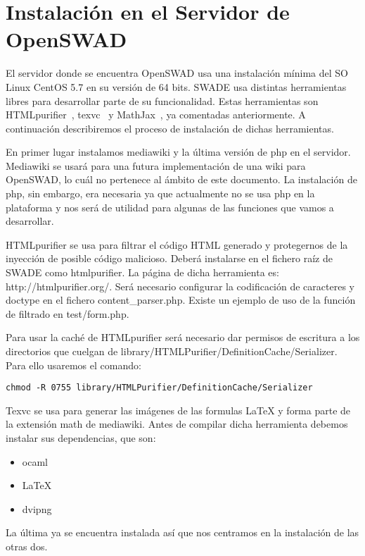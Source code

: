 \chapter{Instalación en el Servidor de OpenSWAD}

El servidor donde se encuentra OpenSWAD usa una instalación mínima del SO Linux CentOS 5.7 en su versión de 64 bits. SWADE usa distintas herramientas libres para desarrollar parte de su funcionalidad. Estas herramientas son HTMLpurifier~\cite{htmlpurifier}, texvc~\cite{texvc} y MathJax~\cite{mathjax}, ya comentadas anteriormente. A continuación describiremos el proceso de instalación de dichas herramientas.

En primer lugar instalamos mediawiki y la última versión de php en el servidor. Mediawiki se usará para una futura implementación de una wiki para OpenSWAD, lo cuál no pertenece al ámbito de este documento. La instalación de php, sin embargo, era necesaria ya que actualmente no se usa php en la plataforma y nos será de utilidad para algunas de las funciones que vamos a desarrollar.

HTMLpurifier se usa para filtrar el código HTML generado y protegernos de la inyección de posible código malicioso. Deberá instalarse en el fichero raíz de SWADE como htmlpurifier. La página de dicha herramienta es: http://htmlpurifier.org/. Será necesario configurar la codificación de caracteres y doctype en el fichero content\_parser.php. Existe un ejemplo de uso de la función de filtrado en test/form.php.

Para usar la caché de HTMLpurifier será necesario dar permisos de escritura a los directorios que cuelgan de library/HTMLPurifier/DefinitionCache/Serializer. Para ello usaremos el comando: 

\begin{verbatim}
chmod -R 0755 library/HTMLPurifier/DefinitionCache/Serializer
\end{verbatim}

Texvc se usa para generar las imágenes de las formulas LaTeX y forma parte de la extensión math de mediawiki. Antes de compilar dicha herramienta debemos instalar sus dependencias, que son:
\begin{itemize}
\item ocaml
\item LaTeX
\item dvipng
\end{itemize}

La última ya se encuentra instalada así que nos centramos en la instalación de las otras dos. 

